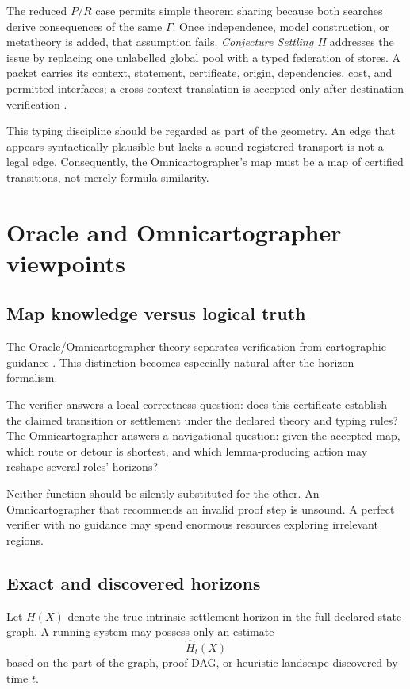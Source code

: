 \documentclass[11pt]{article}
\theoremstyle{remark}
\begin{document}
The reduced $P/R$ case permits simple theorem sharing because both searches derive consequences of the same $\Gamma$. Once independence, model construction, or metatheory is added, that assumption fails. \emph{Conjecture Settling II} addresses the issue by replacing one unlabelled global pool with a typed federation of stores. A packet carries its context, statement, certificate, origin, dependencies, cost, and permitted interfaces; a cross-context translation is accepted only after destination verification \cite{TennesonCSII}.

This typing discipline should be regarded as part of the geometry. An edge that appears syntactically plausible but lacks a sound registered transport is not a legal edge. Consequently, the Omnicartographer's map must be a map of certified transitions, not merely formula similarity.

\section{Oracle and Omnicartographer viewpoints}

\subsection{Map knowledge versus logical truth}

The Oracle/Omnicartographer theory separates verification from cartographic guidance \cite{TennesonOracle}. This distinction becomes especially natural after the horizon formalism.

The verifier answers a local correctness question: does this certificate establish the claimed transition or settlement under the declared theory and typing rules? The Omnicartographer answers a navigational question: given the accepted map, which route or detour is shortest, and which lemma-producing action may reshape several roles' horizons?

Neither function should be silently substituted for the other. An Omnicartographer that recommends an invalid proof step is unsound. A perfect verifier with no guidance may spend enormous resources exploring irrelevant regions.

\subsection{Exact and discovered horizons}

Let $H(X)$ denote the true intrinsic settlement horizon in the full declared state graph. A running system may possess only an estimate
\[
\widehat H_t(X)
\]
based on the part of the graph, proof DAG, or heuristic landscape discovered by time $t$.
\end{document}
